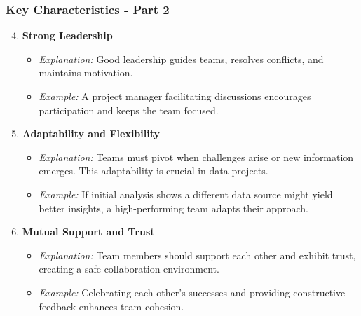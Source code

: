 \documentclass[aspectratio=169]{beamer}
\begin{document}
\begin{frame}[fragile]
    \frametitle{Key Characteristics - Part 2}
    \begin{enumerate}
        \setcounter{enumi}{3}
        \item \textbf{Strong Leadership}
        \begin{itemize}
            \item \textit{Explanation:} Good leadership guides teams, resolves conflicts, and maintains motivation.
            \item \textit{Example:} A project manager facilitating discussions encourages participation and keeps the team focused.
        \end{itemize}
        
        \item \textbf{Adaptability and Flexibility}
        \begin{itemize}
            \item \textit{Explanation:} Teams must pivot when challenges arise or new information emerges. This adaptability is crucial in data projects.
            \item \textit{Example:} If initial analysis shows a different data source might yield better insights, a high-performing team adapts their approach.
        \end{itemize}
        
        \item \textbf{Mutual Support and Trust}
        \begin{itemize}
            \item \textit{Explanation:} Team members should support each other and exhibit trust, creating a safe collaboration environment.
            \item \textit{Example:} Celebrating each other's successes and providing constructive feedback enhances team cohesion.
        \end{itemize}
    \end{enumerate}
\end{frame}
\end{document}
